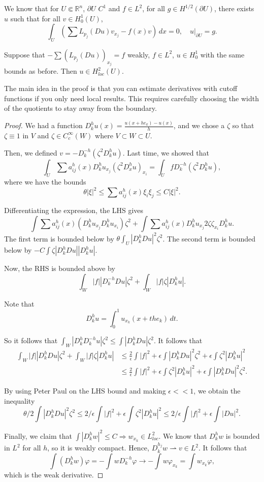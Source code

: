 \documentclass[12pt]{scrartcl}
\newcommand{\R}{\mathbb{R}}
\newcommand{\<}{\langle}
\renewcommand{\>}{\rangle}
\let \phi \varphi
\let \weakto \rightharpoonup
\begin{document}
We know that for $U \Subset \R^n$, $\partial U$ $C^1$ and $f \in L^2$, for all $g \in H^{1/2}(\partial U)$, there exists $u$ such that for all $v \in H_0^1(U)$, 
$$\int_U (\sum L_{p_j}(Du)v_{x_j} - f(x)v)\,dx = 0, \quad u\vert_{\partial U} = g.$$

\begin{theorem} Suppose that $- \sum (L_{p_j}(Du))_{x_j} = f$ weakly, $f \in L^2$, $u \in H_0^1$ with the same bounds as before.  Then $u \in H_{loc}^2(U)$.  
\end{theorem} 
\begin{remark} The main idea in the proof is that you can estimate derivatives with cutoff functions if you only need local results.  This requires carefully choosing the width of the quotients to stay away from the boundary.  
\end{remark}
\begin{proof}
We had a function $D_k^h u(x) = \frac{u(x + he_k) - u(x)}{h}$, and we chose a $\zeta$ so that $\zeta \equiv 1$ in $V$ and $\zeta \in C_c^\infty(W)$ where $V \subset W \subset U$.  

Then, we defined $v = -D_k^{-h}(\zeta^2 D_k^h u)$.  Last time, we showed that 
$$\int_U \sum a_{ij}^h(x) D_k^h u_{x_j} (\zeta^2 D_x^h u)_{x_i} = \int_U f D_k^{-h}(\zeta^2 D_k^h u),$$
where we have the bounds
$$\theta |\xi|^2 \le \sum a_{ij}^h(x) \xi_i \xi_j \le C|\xi|^2.$$

Differentiating the expression, the LHS gives
$$ \int \sum a_{ij}^h(x)(D_k^h u_{x_{j}} D_k^h u_{x_i})\zeta^2 + \int \sum a_{ij}^h(x) D_k^h u_{x_j} 2\zeta \zeta_{x_i} D_k^h u.$$
The first term is bounded below by $\theta \int_U |D_k^h Du|^2 \zeta^2$.  The second term is bounded below by $-C\int \zeta| D_k^h Du| |D_k^h u|$.

Now, the RHS is bounded above by
$$\int_W |f| |D_k^{-h}Du|\zeta^2 + \int_W |f| \zeta |D_k^h u|.$$

Note that 
$$D_k^h u = \int_0^1 u_{x_k}(x + t h e_k)\,dt.$$

So it follows that $\int_W |D_k^h D_k^{-h} u|\zeta^2 \le \int |D_k^h Du|\zeta^2$.  It follows that 
\begin{align*}
\int_W |f| |D_k^h Du|\zeta^2 + \int_W |f| \zeta |D_k^h u| &\le \frac{2}{\epsilon} \int |f|^2 + \epsilon \int |D_k^h Du|^2 \zeta^2 + \epsilon \int \zeta^2 |D_k^h u|^2\\
&\le \frac{2}{\epsilon} \int |f|^2 + \epsilon \int \zeta^2 |D_k^h u|^2 + \epsilon \int |D_k^h Du|^2 \zeta^2.
\end{align*}

By using Peter Paul on the LHS bound and making $\epsilon << 1$, we obtain the inequality
$$\theta/2 \int |D_k^h Du|^2 \zeta^2 \le 2/\epsilon \int |f|^2 + \epsilon \int \zeta^2 |D_k^h u|^2 \le 2/\epsilon \int |f|^2 + \epsilon \int |Du|^2.$$

Finally, we claim that $\int |D_k^h w|^2 \le C \Rightarrow w_{x_k} \in L^2_{loc}$.  We know that $D_k^h w$ is bounded in $L^2$ for all $h$, so it is weakly compact.  Hence, $D_k^{h_j} w \weakto v \in L^2$.  It follows that $$\int (D_k^h w)\phi = -\int w D_k^{-h} \phi \to - \int w \phi_{x_k} = \int w_{x_k} \phi,$$
which is the weak derivative.  
\end{proof}
\end{document}
